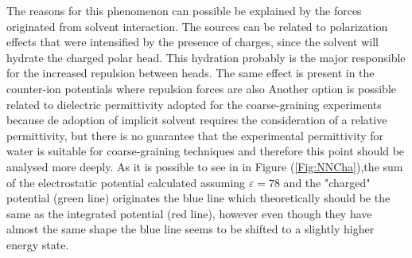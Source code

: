 \documentclass[10pt,a4paper,twoside]{article}
\begin{document}
The reasons for this phenomenon can possible be explained by the forces originated from solvent interaction. The sources can be related to polarization effects that were intensified by the presence of charges, since the solvent will hydrate the charged polar head. This hydration probably is the major responsible for the increased repulsion between heads. The same effect is present in the counter-ion potentials where repulsion forces are also  Another option is possible related to dielectric permittivity adopted for the coarse-graining experiments because de adoption of implicit solvent requires the consideration of a relative permittivity, but there is no guarantee  that the experimental permittivity for water is suitable for coarse-graining techniques and therefore this point should be analysed more deeply.  As it is possible to see in in Figure (\ref{Fig:NNCha}),the sum of the electrostatic potential calculated assuming $\varepsilon = 78$ and the "charged" potential (green line) originates the blue line which theoretically should be the same as the integrated potential (red line), however even though they have almost the same shape the blue line seems to be shifted to a slightly higher energy state.
\end{document}
